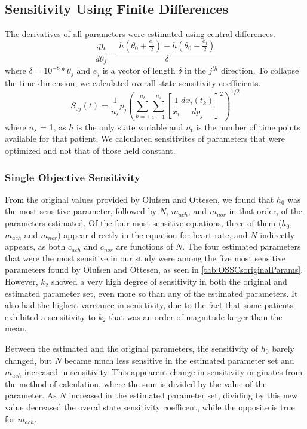 \documentclass[fleqn,10pt]{wlscirep}
\begin{document}
\subsection*{Sensitivity Using Finite Differences}
The derivatives of all parameters were estimated using central differences. 
\begin{equation}
\frac{dh}{d\theta_j} = \frac{h(\theta_0+\frac{e_j}{2})-h(\theta_0-\frac{e_j}{2})}{\delta}
\end{equation}
where $\delta=10^{-8}*\theta_j$ and $e_j$ is a vector of length $\delta$ in the $j^{th}$ direction.
To collapse the time dimension, we calculated overall state sensitivity coefficients. \cite{stelling2004robustness}
\begin{equation}
S_{0j}(t) = \frac{1}{n_s}p_j \left(\sum_{k=1}^{n_t} \sum_{i=1}^{n_s} \left[ \frac{1}{x_i} \frac{dx_i(t_k)}{dp_j} \right]^2 \right)^{1/2}
\end{equation}
where $n_s$ = 1, as $h$ is the only state variable and $n_t$ is the number of time points available for that patient. We calculated sensitivites of parameters that were optimized and not that of those held constant.
\subsubsection*{Single Objective Sensitivity}
From the original values provided by Olufsen and Ottesen, we found that $h_0$ was the most sensitive parameter, followed by $N$, $m_{ach}$, and $m_{nor}$ in that order, of the parameters estimated. Of the four most sensitive equations, three of them ($h_0$, $m_{ach}$ and $m_{nor}$) appear directly in the equation for heart rate, and $N$ indirectly appears, as both $c_{ach}$ and $c_{nor}$ are functions of $N$.
The four estimated parameters that were the most sensitive in our study were among the five most sensitive parameters found by Olufsen and Ottesen, as seen in \ref{tab:OSSCsoriginalParams}. However, $k_2$ showed a very high degree of sensitivity in both the original and estimated parameter set, even more so than any of the estimated parameters. It also had the highest varriance in sensitivity, due to the fact that some patients exhibited a sensitivity to $k_2$ that was an order of magnitude larger than the mean. 

Between the estimated and the original parameters, the sensitivity of $h_0$ barely changed, but $N$ became much less sensitive in the estimated parameter set and $m_{ach}$ increased in sensitivity. This appearent change in sensitivity originates from the method of calculation, where the sum is divided by the value of the parameter. As $N$ increased in the estimated parameter set, dividing by this new value decreased the overal state sensitivity coefficent, while the opposite is true for $m_{ach}$.
\end{document}
